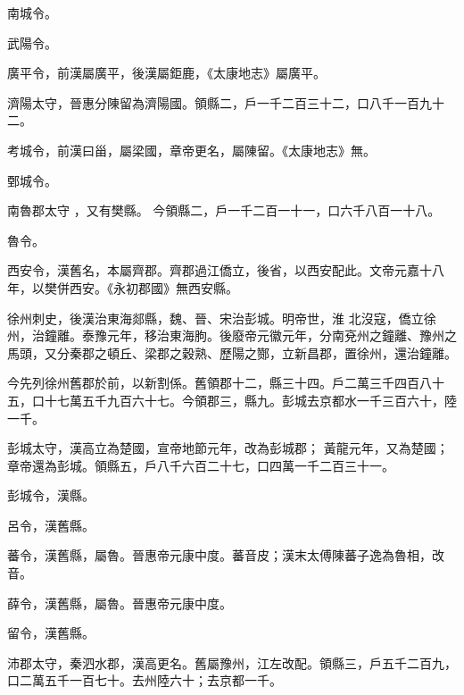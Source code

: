 \begin{pinyinscope}
南城令。


武陽令。



 廣平令，前漢屬廣平，後漢屬鉅鹿，《太康地志》屬廣平。



 濟陽太守，晉惠分陳留為濟陽國。領縣二，戶一千二百三十二，口八千一百九十二。



 考城令，前漢曰甾，屬梁國，章帝更名，屬陳留。《太康地志》無。


鄄城令。


南魯郡太守
 ，又有樊縣。
 今領縣二，戶一千二百一十一，口六千八百一十八。


魯令。



 西安令，漢舊名，本屬齊郡。齊郡過江僑立，後省，以西安配此。文帝元嘉十八年，以樊併西安。《永初郡國》無西安縣。



 徐州刺史，後漢治東海郯縣，魏、晉、宋治彭城。明帝世，淮
 北沒寇，僑立徐州，治鐘離。泰豫元年，移治東海朐。後廢帝元徽元年，分南兗州之鐘離、豫州之馬頭，又分秦郡之頓丘、梁郡之穀熟、歷陽之酂，立新昌郡，置徐州，還治鐘離。



 今先列徐州舊郡於前，以新割係。舊領郡十二，縣三十四。戶二萬三千四百八十五，口十七萬五千九百六十七。今領郡三，縣九。彭城去京都水一千三百六十，陸一千。



 彭城太守，漢高立為楚國，宣帝地節元年，改為彭城郡；
 黃龍元年，又為楚國；章帝還為彭城。領縣五，戶八千六百二十七，口四萬一千二百三十一。



 彭城令，漢縣。



 呂令，漢舊縣。



 蕃令，漢舊縣，屬魯。晉惠帝元康中度。蕃音皮；漢末太傅陳蕃子逸為魯相，改音。



 薛令，漢舊縣，屬魯。晉惠帝元康中度。



 留令，漢舊縣。



 沛郡太守，秦泗水郡，漢高更名。舊屬豫州，江左改配。領縣三，戶五千二百九，口二萬五千一百七十。去州陸六十；去京都一千。




\end{pinyinscope}
